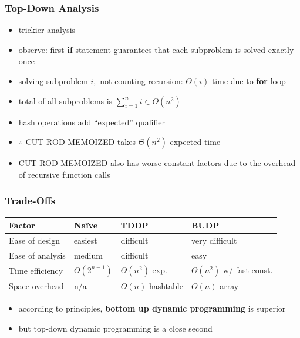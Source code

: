 \documentclass[10pt,aspectratio=169]{beamer}
\newcommand{\Naive}{Na\"{i}ve~}
\begin{document}
\begin{frame} \frametitle{Top-Down Analysis}
    \begin{itemize}
      \item trickier analysis
      \item observe: first \textbf{if} statement guarantees that each subproblem is solved exactly once
      \item solving subproblem $i,$ not counting recursion: $\Theta(i)$ time due to \textbf{for} loop
      \item total of all subproblems is $\sum_{i=1}^n i \in \Theta(n^2)$
      \item hash operations add ``expected'' qualifier
      \item $\therefore$ CUT-ROD-MEMOIZED takes $\Theta(n^2)$ expected time
      \item CUT-ROD-MEMOIZED also has worse constant factors due to the overhead of recursive function calls
    \end{itemize}
\end{frame}

\begin{frame} \frametitle{Trade-Offs}
\begin{center}
  \begin{tabular}{llll}
    \textbf{Factor} & \textbf{\Naive} & \textbf{TDDP} & \textbf{BUDP} \\ \hline
    Ease of design & easiest & difficult & very difficult \\
    Ease of analysis & medium & difficult & easy \\
    Time efficiency & $O(2^{n-1})$ & $\Theta(n^2)$ exp. & $\Theta(n^2)$ w/ fast const. \\
    Space overhead & n/a & $O(n)$ hashtable & $O(n)$ array \\
  \end{tabular}
\end{center}

\begin{itemize}
  \item according to principles, \textbf{bottom up dynamic programming} is superior
  \item but top-down dynamic programming is a close second
\end{itemize}
\end{frame}
\end{document}
